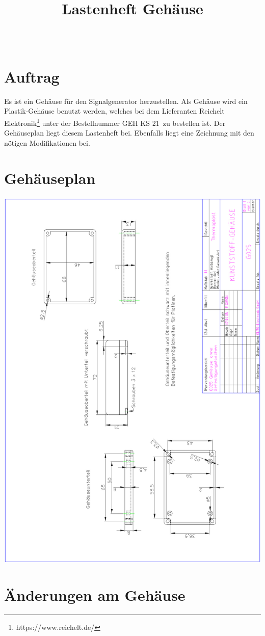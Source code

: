 \documentclass[a4paper,12pt]{article}
\title{\projekt \\ Lastenheft Gehäuse}
\author{\authorName\\ \Arbeitgeber }
\begin{document}
\maketitle
\setcounter{page}{2}
\tableofcontents
\clearpage
{}

\section{Auftrag}
Es ist ein Gehäuse für den Signalgenerator herzustellen. Als Gehäuse wird ein Plastik-Gehäuse benutzt werden, welches bei dem Lieferanten Reichelt Elektronik\footnote{https://www.reichelt.de/} unter der Bestellnummer \glqq GEH KS 21\grqq\ zu bestellen ist. Der Gehäuseplan liegt diesem Lastenheft bei. Ebenfalls liegt eine Zeichnung mit den nötigen Modifikationen bei.

\section{Gehäuseplan}
\begin{center}
\includegraphics[scale=0.8]{Gehauseplan.png}
\end{center}

\section{Änderungen am Gehäuse}
\end{document}
